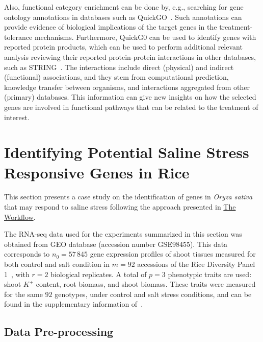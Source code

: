 \documentclass{bmcart}
\begin{document}
Also, functional category enrichment can be done by, e.g., searching
for gene ontology annotations in databases such as
QuickGO~\cite{binns2009quickgo}. Such annotations can provide evidence
of biological implications of the target genes in the
treatment-tolerance mechanisms. Furthermore, QuickG0 can be used to
identify genes with reported protein products, which can be used to
perform additional relevant analysis reviewing their reported
protein-protein interactions in other databases, such as
STRING~\cite{szklarczyk2016string}. The interactions include direct
(physical) and indirect (functional) associations, and they stem from
computational prediction, knowledge transfer between organisms, and
interactions aggregated from other (primary) databases. This
information can give new insights on how the selected genes are
involved in functional pathways that can be related to the treatment
of interest.

\section*{Identifying Potential Saline Stress Responsive Genes in Rice}
\label{sec.case}

This section presents a case study on the identification of genes in
\textit{Oryza sativa} that may respond to saline stress following the
approach presented in %
\hyperref[sec.framework]{The Workflow}.
\vspace{0.5cm}

The RNA-seq data used for the experiments summarized in this section
was obtained from GEO database \cite{clough2016gene} (accession
number GSE98455). This data corresponds to $n_0=57\,845$ gene
expression profiles of shoot tissues measured for both control and
salt condition in $m=92$ accessions of the Rice Diversity Panel 1~\cite{eizenga2014registration},
with $r=2$ biological replicates. A total of $p=3 $ phenotypic traits
are used: shoot $K^+$ content, root biomass, and shoot biomass. These
traits were measured for the same $92$ genotypes, under control and
salt stress conditions, and can be found in the supplementary
information of~\cite{campbell2017allelic}.

\subsection*{Data Pre-processing}
\end{document}
